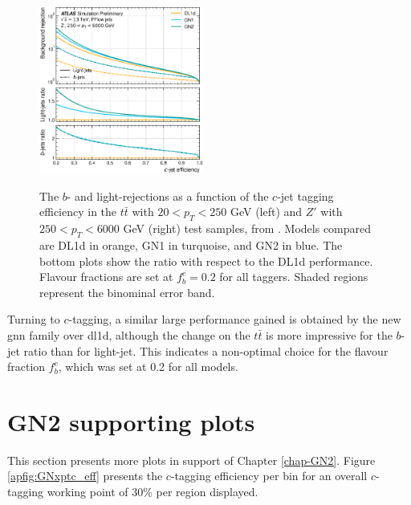 \begin{center}
\begin{figure}[h!]
{    \includegraphics[width=0.48\textwidth]{Images/FTAG/GN/GN2/ROCpublic/zpc.png}
    }
    \caption{The $b$- and light-rejections as a function of the $c$-jet tagging efficiency in the $t\bar{t}$ with $20 < p_T < 250$ GeV (left) and $Z'$ with $250 < p_T < 6000$ GeV (right) test samples, from \cite{ATL-PLOT-FTAG-2023-01}. Models compared are DL1d in orange, GN1 in turquoise, and GN2 in blue. The bottom plots show the ratio with respect to the DL1d performance. Flavour fractions are set at $f^c_b = 0.2$ for all taggers. Shaded regions represent the binominal error band.}
    \label{apfig:GN2rocc}
    \end{figure}
\end{center}

Turning to $c$-tagging, a similar large performance gained is obtained by the new \gls{gnn} family over \gls{dl1d}, although the change on the $t\bar{t}$ is more impressive for the $b$-jet ratio than for light-jet. This indicates a non-optimal choice for the flavour fraction $f^c_b$, which was set at 0.2 for all models.

\section{GN2 supporting plots}\label{app-GN2sup}
This section presents more plots in support of Chapter \ref{chap-GN2}. Figure \ref{apfig:GNxptc_eff} presents the $c$-tagging efficiency per bin for an overall $c$-tagging working point of 30\% per region displayed. 

